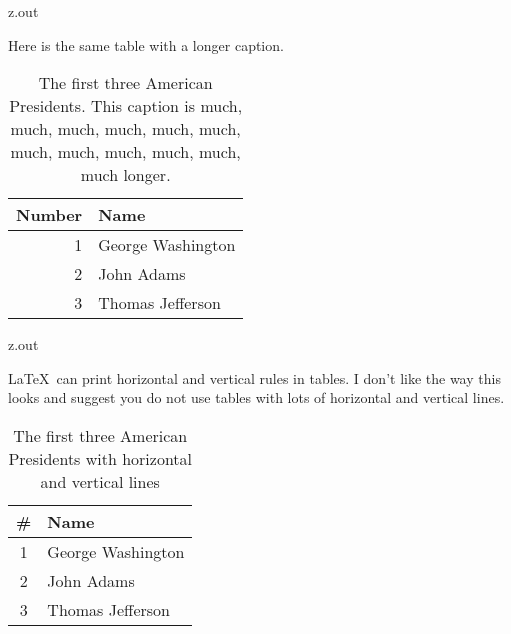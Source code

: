\begin{VerbatimOut}{z.out}

\newpage

Here is the same table with a longer caption.

\begin{table}[ht]
  \caption{%
    The first three American Presidents.
    This caption is
    much, much, much, much, much, much,
    much, much, much, much, much, much
    longer.%
  }
  \vspace*{6pt}
  \centering
    \begin{tabular}{@{}rl@{}}
      \toprule
      \bf Number& \bf Name\\
      \midrule
      1& George Washington\\
      2& John Adams\\
      3& Thomas Jefferson\\
      \bottomrule
    \end{tabular}
  \label{ta:first-three-american-presidents-longer-caption}
\end{table}
\end{VerbatimOut}

\MyIOS


\begin{VerbatimOut}{z.out}

\newpage

\LaTeX\ can print horizontal
and vertical rules in tables.
I don't like the way this looks 
and suggest you do not use tables
with lots of horizontal and vertical lines.
\begin{table}[ht]
  \caption{The first three American Presidents with horizontal and vertical lines}
  \vspace*{6pt}
  \centering
    \begin{tabular}{|c|l|}
      \hline
      \bf\#& \bf Name\\
      \hline
      1& George Washington\\
      \hline
      2& John Adams\\
      \hline
      3& Thomas Jefferson\\
      \hline
    \end{tabular}
  \label{ta:American-Presidents-with-horizontal}
\end{table}
\end{VerbatimOut}


